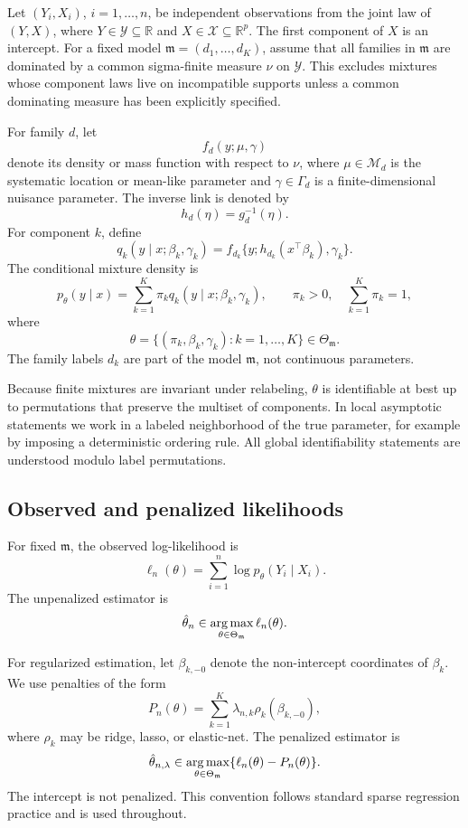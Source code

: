 Let \((Y_i,X_i)\), \(i=1,\ldots,n\), be independent observations from the joint
law of \((Y,X)\), where \(Y\in\mathcal Y\subseteq\mathbb R\) and
\(X\in\mathcal X\subseteq\mathbb R^p\).  The first component of \(X\) is an
intercept.  For a fixed model \(\mathfrak m=(d_1,\ldots,d_K)\), assume that all
families in \(\mathfrak m\) are dominated by a common sigma-finite measure
\(\nu\) on \(\mathcal Y\).  This excludes mixtures whose component laws live on
incompatible supports unless a common dominating measure has been explicitly
specified.

For family \(d\), let
\[
    f_d(y;\mu,\gamma)
\]
denote its density or mass function with respect to \(\nu\), where
\(\mu\in\mathcal M_d\) is the systematic location or mean-like parameter and
\(\gamma\in\Gamma_d\) is a finite-dimensional nuisance parameter.  The inverse
link is denoted by
\[
    h_d(\eta)=g_d^{-1}(\eta).
\]
For component \(k\), define
\[
    q_k(y\mid x;\beta_k,\gamma_k)
    =
    f_{d_k}\{y;h_{d_k}(x^\top\beta_k),\gamma_k\}.
\]
The conditional mixture density is
\[
    p_\theta(y\mid x)
    =
    \sum_{k=1}^K \pi_k q_k(y\mid x;\beta_k,\gamma_k),
    \qquad
    \pi_k>0,\quad \sum_{k=1}^K\pi_k=1,
\]
where
\[
    \theta=\{(\pi_k,\beta_k,\gamma_k):k=1,\ldots,K\}\in\Theta_{\mathfrak m}.
\]
The family labels \(d_k\) are part of the model \(\mathfrak m\), not continuous
parameters.

Because finite mixtures are invariant under relabeling, \(\theta\) is
identifiable at best up to permutations that preserve the multiset of
components.  In local asymptotic statements we work in a labeled neighborhood of
the true parameter, for example by imposing a deterministic ordering rule.  All
global identifiability statements are understood modulo label permutations.

\subsection{Observed and penalized likelihoods}

For fixed \(\mathfrak m\), the observed log-likelihood is
\[
    \ell_n(\theta)
    =
    \sum_{i=1}^n
    \log p_\theta(Y_i\mid X_i).
\]
The unpenalized estimator is
\[
    \hat\theta_n
    \in
    \operatorname*{arg\,max}_{\theta\in\Theta_{\mathfrak m}}\ell_n(\theta).
\]

For regularized estimation, let \(\beta_{k,-0}\) denote the non-intercept
coordinates of \(\beta_k\).  We use penalties of the form
\[
    P_n(\theta)
    =
    \sum_{k=1}^K \lambda_{n,k}\rho_k(\beta_{k,-0}),
\]
where \(\rho_k\) may be ridge, lasso, or elastic-net.  The penalized estimator
is
\[
    \hat\theta_{n,\lambda}
    \in
    \operatorname*{arg\,max}_{\theta\in\Theta_{\mathfrak m}}
    \{\ell_n(\theta)-P_n(\theta)\}.
\]
The intercept is not penalized.  This convention follows standard sparse
regression practice \citep{tibshirani1996lasso} and is used throughout.

